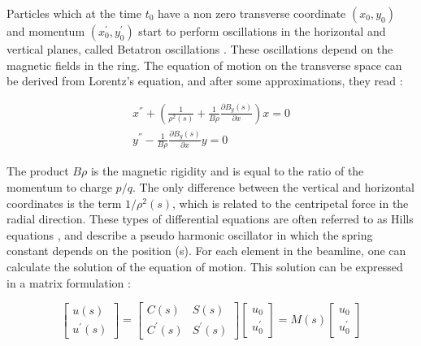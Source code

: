 Particles which at the time $t_0$ have a non zero transverse coordinate $\left(x_0 , y_0 \right)$ and momentum $\left(x_{0}^{'} , y_{0}^{'} \right)$ start to perform oscillations in the horizontal and vertical planes,  called Betatron oscillations \parencite*[][]{ref:BookAccPhysics2}. These oscillations depend on the magnetic fields in the ring. The equation of motion on the transverse space can be derived from Lorentz's equation, and after some approximations, they read \parencite*[][]{ref:ApproxEqMotion}:

\begin{equation}
    \begin{aligned}
        x^{''} + \left(\frac{1}{\rho^{2}(s)}+\frac{1}{B\rho}\frac{\partial B_y(s)}{\partial x} \right)  x = 0 \\
        y^{''} - \frac{1}{B \rho}\frac{\partial B_y (s)}{\partial x}  y = 0
    \end{aligned}
    \label{eq:EqMotion}
\end{equation}

The product $B \rho$ is the magnetic rigidity and is equal to the ratio of the momentum to charge $p/q$. The only difference between the vertical and horizontal coordinates is the term $1/\rho^2(s)$, which is related to the centripetal force in the radial direction. These types of differential equations are often referred to as Hills equations \parencite*[][]{ref:HillEquation}, and describe a pseudo harmonic oscillator in which the spring constant depends on the position (s). For each element in the beamline, one can calculate the solution of the equation of motion. This solution can be expressed in a matrix formulation \parencite*[][]{ref:MatrixForm}:

\begin{equation}
    \begin{bmatrix}
        u(s) \\ u^{'}(s) 
   \end{bmatrix}
   = 
   \begin{bmatrix}
        C(s) & S(s) \\ C^{'}(s)  & S^{'}(s)
   \end{bmatrix}
   \begin{bmatrix}
        u_0 \\ u^{'}_0
   \end{bmatrix}
   =
   M(s) 
   \begin{bmatrix}
        u_0 \\ u^{'}_0
   \end{bmatrix}
\end{equation}

